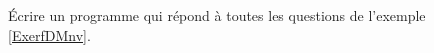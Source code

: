 
\begin{exercice}\label{exoPremiere-0038}

    Écrire un programme qui répond à toutes les questions de l'exemple \ref{ExerfDMnv}.

\end{exercice}
